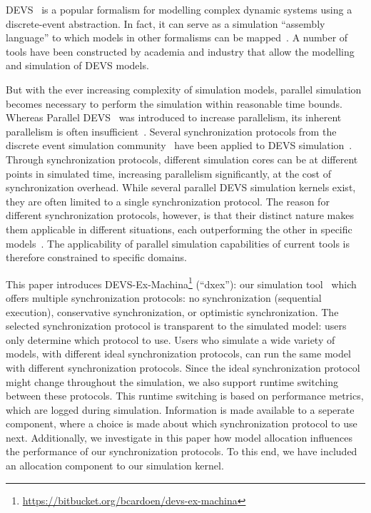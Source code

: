 \textsf{DEVS}~\cite{ClassicDEVS} is a popular formalism for modelling complex dynamic systems using a discrete-event abstraction.
In fact, it can serve as a simulation ``assembly language'' to which models in other formalisms can be mapped~\cite{DEVSbase}.
A number of tools have been constructed by academia and industry that allow the modelling and simulation of \textsf{DEVS} models.

But with the ever increasing complexity of simulation models, parallel simulation becomes necessary to perform the simulation within reasonable time bounds.
Whereas \textsf{Parallel DEVS}~\cite{ParallelDEVS} was introduced to increase parallelism, its inherent parallelism is often insufficient~\cite{Himmelspach}.
Several synchronization protocols from the discrete event simulation community~\cite{FujimotoBook} have been applied to \textsf{DEVS} simulation~\cite{globaltimewarp}.
Through synchronization protocols, different simulation cores can be at different points in simulated time, increasing parallelism significantly, at the cost of synchronization overhead.
While several parallel \textsf{DEVS} simulation kernels exist, they are often limited to a single synchronization protocol.
The reason for different synchronization protocols, however, is that their distinct nature makes them applicable in different situations, each outperforming the other in specific models~\cite{Jafer}.
The applicability of parallel simulation capabilities of current tools is therefore constrained to specific domains.

This paper introduces DEVS-Ex-Machina\footnote{\url{https://bitbucket.org/bcardoen/devs-ex-machina}} (``dxex''): our simulation tool~\cite{dxex} which offers multiple synchronization protocols: no synchronization (sequential execution), conservative synchronization, or optimistic synchronization.
The selected synchronization protocol is transparent to the simulated model: users only determine which protocol to use.
Users who simulate a wide variety of models, with different ideal synchronization protocols, can run the same model with different synchronization protocols.
Since the ideal synchronization protocol might change throughout the simulation, we also support runtime switching between these protocols.
This runtime switching is based on performance metrics, which are logged during simulation.
Information is made available to a seperate component, where a choice is made about which synchronization protocol to use next.
Additionally, we investigate in this paper how model allocation influences the performance of our synchronization protocols.
To this end, we have included an allocation component to our simulation kernel.

